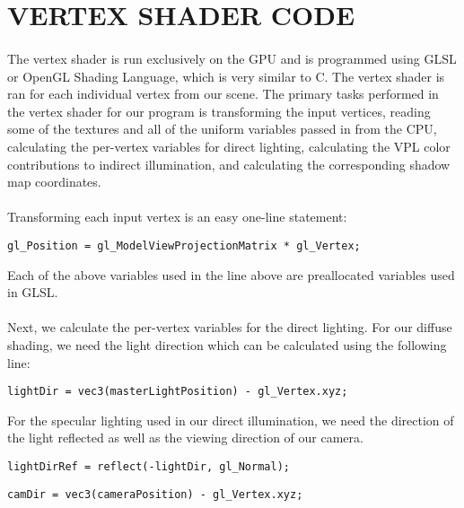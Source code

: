 \section{VERTEX SHADER CODE}
\paragraph{}
The vertex shader is run exclusively on the GPU and is programmed using GLSL or OpenGL Shading Language, which is very similar to C.  The vertex shader is ran for each individual vertex from our scene.  The primary tasks performed in the vertex shader for our program is transforming the input vertices, reading some of the textures and all of the uniform variables passed in from the CPU, calculating the per-vertex variables for direct lighting, calculating the VPL color contributions to indirect illumination, and calculating the corresponding shadow map coordinates.

\paragraph{}
Transforming each input vertex is an easy one-line statement:

\begin{lstlisting}
gl_Position = gl_ModelViewProjectionMatrix * gl_Vertex;
\end{lstlisting}

Each of the above variables used in the line above are preallocated variables used in GLSL.

\paragraph{}
Next, we calculate the per-vertex variables for the direct lighting.  For our diffuse shading, we need the light direction which can be calculated using the following line:

\begin{lstlisting}
lightDir = vec3(masterLightPosition) - gl_Vertex.xyz;
\end{lstlisting}

For the specular lighting used in our direct illumination, we need the direction of the light reflected as well as the viewing direction of our camera.

\begin{lstlisting}
lightDirRef = reflect(-lightDir, gl_Normal);
\end{lstlisting}

\begin{lstlisting}
camDir = vec3(cameraPosition) - gl_Vertex.xyz;
\end{lstlisting}

